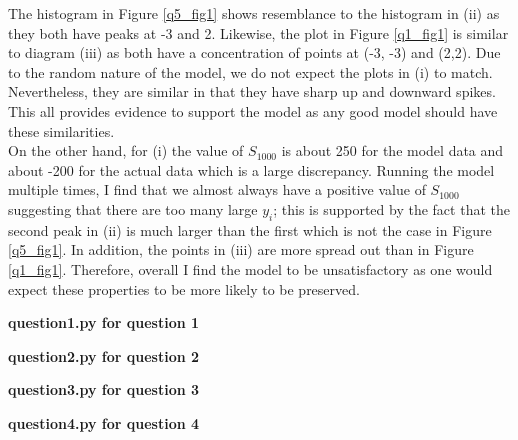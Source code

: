 \documentclass[12pt, a4paper]{article}
\begin{document}
The histogram in Figure \ref{q5_fig1} shows resemblance to the histogram in (ii) as they both have peaks at -3 and 2. Likewise, the plot in Figure \ref{q1_fig1} is similar to diagram (iii) as both have a concentration of points at (-3, -3) and (2,2). Due to the random nature of the model, we do not expect the plots in (i) to match. Nevertheless, they are similar in that they have sharp up and downward spikes. This all provides evidence to support the model as any good model should have these similarities.
\\

On the other hand, for (i) the value of $S_{1000}$ is about 250 for the model data and about -200 for the actual data which is a large discrepancy. Running the model multiple times, I find that we almost always have a positive value of $S_{1000}$ suggesting that there are too many large $y_{i}$; this is supported by the fact that the second peak in (ii) is much larger than the first which is not the case in Figure \ref{q5_fig1}. In addition, the points in (iii) are more spread out than in Figure \ref{q1_fig1}. Therefore, overall I find the model to be unsatisfactory as one would expect these properties to be more likely to be preserved.



\pagebreak
\textbf{question\textunderscore1.py for question 1}\centering\label{question1}

\vspace{2cm}

\pagebreak
\textbf{question\textunderscore2.py for question 2}\centering\label{question2}

\vspace{2cm}

\pagebreak
\textbf{question\textunderscore3.py for question 3}\centering\label{question3}

\vspace{2cm}

\pagebreak
\textbf{question\textunderscore4.py for question 4}\centering\label{question4}

\vspace{2cm}
\end{document}
